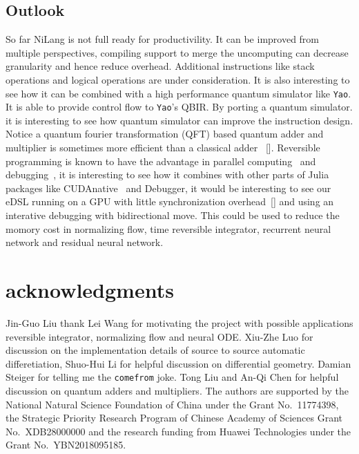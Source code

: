 \documentclass[aps,twocolumn,longbibliography,english,superscriptaddress,prr]{revtex4-1}
\newcommand{\<}{\langle}
\renewcommand{\>}{\rangle}
\newcommand{\blue}[1]{[{\bf  \color{blue}{JG: #1}}]}
\theoremstyle{definition}\newtheorem{definition}{\textit{Definition}}
\begin{document}
\subsection{Outlook}\label{sec:outlook}
So far NiLang is not full ready for productivility. It can be improved from multiple perspectives, compiling support to merge the uncomputing can decrease granularity and hence reduce overhead. Additional instructions like stack operations and logical operations are under consideration. It is also interesting to see how it can be combined with a high performance quantum simulator like \texttt{Yao}. It is able to provide control flow to \texttt{Yao}'s QBIR. By porting a quantum simulator. it is interesting to see how quantum simulator can improve the instruction design. Notice a quantum fourier transformation (QFT) based quantum adder and multiplier is sometimes more efficient than a classical adder~\cite{Haener2018} \blue{Is this true?}.
Reversible programming is known to have the advantage in parallel computing~\cite{Jefferson1985} and debugging~\cite{Boothe2000}, it is interesting to see how it combines with other parts of Julia packages like CUDAnative~\cite{Besard2018} and Debugger, it would be interesting to see our eDSL running on a GPU with little synchronization overhead~\blue{Is this even possible?} and using an interative debugging with bidirectional move.
This could be used to reduce the momory cost in normalizing flow, time reversible integrator, recurrent neural network and residual neural network.

\section{acknowledgments}
Jin-Guo Liu thank Lei Wang for motivating the project with possible applications reversible integrator, normalizing flow and neural ODE.
Xiu-Zhe Luo for discussion on the implementation details of source to source automatic differetiation,
Shuo-Hui Li for helpful discussion on differential geometry.
Damian Steiger for telling me the \texttt{comefrom} joke.
Tong Liu and An-Qi Chen for helpful discussion on quantum adders and multipliers.
The authors are supported by the National Natural Science Foundation of China under the Grant No.~11774398, the Strategic Priority Research Program of Chinese Academy of Sciences Grant No.~XDB28000000 and the research funding from Huawei Technologies under the Grant No.~YBN2018095185.



\end{document}
